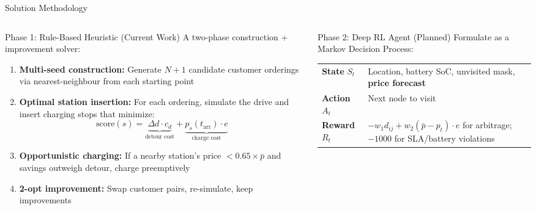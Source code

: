 \documentclass[aspectratio=169, 11pt]{beamer}
\begin{document}
\begin{frame}{Solution Methodology}

\begin{columns}[T]
\begin{column}{0.50\textwidth}

\begin{block}{Phase 1: Rule-Based Heuristic (Current Work)}
A two-phase construction + improvement solver:
\begin{enumerate}
    \item \textbf{Multi-seed construction:} Generate $N\!+\!1$ candidate customer orderings via nearest-neighbour from each starting point
    \item \textbf{Optimal station insertion:} For each ordering, simulate the drive and insert charging stops that minimize:
    \[
    \text{score}(s) = \underbrace{\Delta d \cdot c_d}_{\text{detour cost}} + \underbrace{p_s(t_{\text{arr}}) \cdot e}_{\text{charge cost}}
    \]
    \item \textbf{Opportunistic charging:} If a nearby station's price $< 0.65 \times \bar{p}$ and savings outweigh detour, charge preemptively
    \item \textbf{2-opt improvement:} Swap customer pairs, re-simulate, keep improvements
\end{enumerate}
\end{block}

\end{column}
\begin{column}{0.47\textwidth}

\begin{block}{Phase 2: Deep RL Agent (Planned)}
Formulate as a Markov Decision Process:
\vspace{0.3em}

\renewcommand{\arraystretch}{1.3}
\begin{tabular}{@{}l p{4.5cm}@{}}
\toprule
\textbf{State} $S_t$ & Location, battery SoC, unvisited mask, \textbf{price forecast} \\
\textbf{Action} $A_t$ & Next node to visit \\
\textbf{Reward} $R_t$ & $-w_1 d_{ij} + w_2(\bar{p} - p_t) \cdot e$ for arbitrage; $-1000$ for SLA/battery violations \\
\bottomrule
\end{tabular}


\end{block}
\end{column}
\end{columns}
\end{frame}
\end{document}
